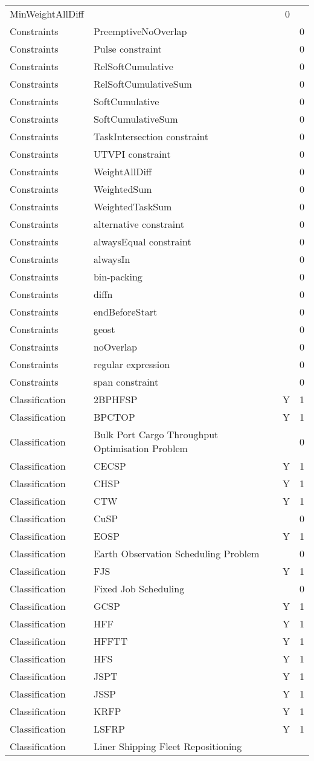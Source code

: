 {\begin{longtable}{lp{10cm}rr}
MinWeightAllDiff &  & 0\\Constraints & PreemptiveNoOverlap &  & 0\\Constraints & Pulse constraint &  & 0\\Constraints & RelSoftCumulative &  & 0\\Constraints & RelSoftCumulativeSum &  & 0\\Constraints & SoftCumulative &  & 0\\Constraints & SoftCumulativeSum &  & 0\\Constraints & TaskIntersection constraint &  & 0\\Constraints & UTVPI constraint &  & 0\\Constraints & WeightAllDiff &  & 0\\Constraints & WeightedSum &  & 0\\Constraints & WeightedTaskSum &  & 0\\Constraints & alternative constraint &  & 0\\Constraints & alwaysEqual constraint &  & 0\\Constraints & alwaysIn &  & 0\\Constraints & bin-packing &  & 0\\Constraints & diffn &  & 0\\Constraints & endBeforeStart &  & 0\\Constraints & geost &  & 0\\Constraints & noOverlap &  & 0\\Constraints & regular expression &  & 0\\Constraints & span constraint &  & 0\\Classification & 2BPHFSP & Y & 1\\Classification & BPCTOP & Y & 1\\Classification & Bulk Port Cargo Throughput Optimisation Problem &  & 0\\Classification & CECSP & Y & 1\\Classification & CHSP & Y & 1\\Classification & CTW & Y & 1\\Classification & CuSP &  & 0\\Classification & EOSP & Y & 1\\Classification & Earth Observation Scheduling Problem &  & 0\\Classification & FJS & Y & 1\\Classification & Fixed Job Scheduling &  & 0\\Classification & GCSP & Y & 1\\Classification & HFF & Y & 1\\Classification & HFFTT & Y & 1\\Classification & HFS & Y & 1\\Classification & JSPT & Y & 1\\Classification & JSSP & Y & 1\\Classification & KRFP & Y & 1\\Classification & LSFRP & Y & 1\\Classification & Liner Shipping Fleet Repositioning 
\end{longtable}}
